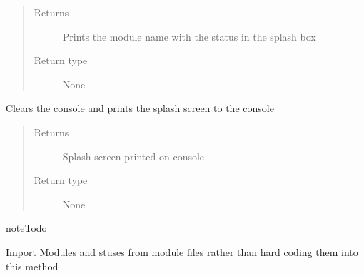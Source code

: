 \documentclass[letterpaper,10pt,english]{sphinxmanual}
\begin{document}
\begin{fulllineitems}
\begin{fulllineitems}
\begin{quote}
\begin{description}
\begin{itemize}
\end{itemize}

\item[{Returns}] \leavevmode
Prints the module name with the status in the splash box

\item[{Return type}] \leavevmode
None

\end{description}\end{quote}

\end{fulllineitems}


\begin{fulllineitems}
\label{\detokenize{MouseReferenceManual:MOUSE.SplashScreen.printSplash}}
Clears the console and prints the splash screen to the console
\begin{quote}\begin{description}
\item[{Returns}] \leavevmode
Splash screen printed on console

\item[{Return type}] \leavevmode
None

\end{description}\end{quote}

\begin{sphinxadmonition}{note}{Todo}

Import Modules and stuses from module files rather than hard coding them into this method
\end{sphinxadmonition}

\end{fulllineitems}


\end{fulllineitems}

\end{document}
